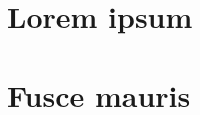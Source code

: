 \documentclass{article}
\begin{document}
\section{Lorem ipsum}
\lipsum[1-4]

\clearpage

\section{Fusce mauris}
\lipsum[5-8]
\end{document}
